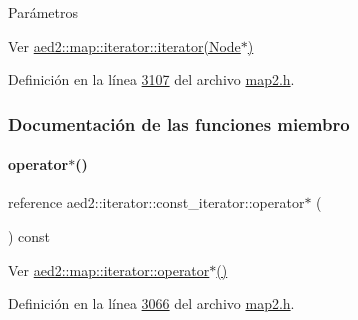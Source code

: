 \begin{DoxyParams}{\-Parámetros}
\begin{DoxyCompactItemize}
Ver \hyperlink{classaed2_1_1map_1_1iterator_ab0ea21abcb32b6d5a72cf341b9029838_ab0ea21abcb32b6d5a72cf341b9029838}{aed2\+::map\+::iterator\+::iterator(\+Node$\ast$)} 



Definición en la línea \hyperlink{map2_8h_source_l03107}{3107} del archivo \hyperlink{map2_8h_source}{map2.\+h}.



\subsubsection{Documentación de las funciones miembro}
\mbox{\label{classaed2_1_1iterator_1_1const__iterator_a43ef67b26f144793d7bec567261738a1_a43ef67b26f144793d7bec567261738a1}} 
\paragraph{\texorpdfstring{operator$\ast$()}{operator*()}}
{\footnotesize\ttfamily reference aed2\+::iterator\+::const\+\_\+iterator\+::operator$\ast$ (\begin{DoxyParamCaption}{ }\end{DoxyParamCaption}) const\hspace{0.3cm}{\ttfamily [inline]}}



Ver \hyperlink{classaed2_1_1map_1_1iterator_ab115711d0295146906830840590d900a_ab115711d0295146906830840590d900a}{aed2\+::map\+::iterator\+::operator$\ast$()} 



Definición en la línea \hyperlink{map2_8h_source_l03066}{3066} del archivo \hyperlink{map2_8h_source}{map2.\+h}.

\mbox{\label{classaed2_1_1iterator_1_1const__iterator_afe8d4dc9ecced7c7f42db1b55f008b77_afe8d4dc9ecced7c7f42db1b55f008b77}} 

\end{DoxyCompactItemize}
\end{DoxyParams}
